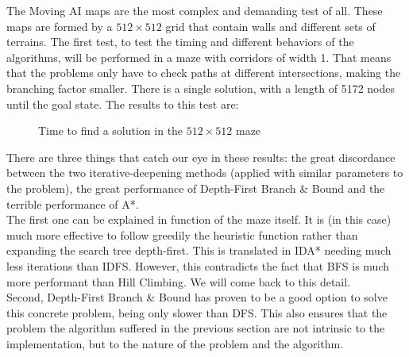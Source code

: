 The Moving AI maps are the most complex and demanding test of all. These maps
are formed by a $512 \times 512$ grid that contain walls and different sets of
terrains. The first test, to test the timing and different behaviors of the
algorithms, will be performed in a maze with corridors of width 1. That means
that the problems only have to check paths at different intersections, making
the branching factor smaller. There is a single solution, with a length of 5172
nodes until the goal state. The results to this test are:\\

\begin{figure}[!htbp]
  \centering
  \caption{Time to find a solution in the $512 \times 512$ maze}
  \label{mp:time}
\end{figure}

There are three things that catch our eye in these results: the great
discordance between the two iterative-deepening methods (applied with similar
parameters to the problem), the great performance of Depth-First Branch \&
Bound and the terrible performance of A*.\\

The first one can be explained in function of the maze itself. It is (in this
case) much more effective to follow greedily the heuristic function rather than
expanding the search tree depth-first. This is translated in IDA* needing much
less iterations than IDFS. However, this contradicts the fact that BFS is much
more performant than Hill Climbing. We will come back to this detail.\\

Second, Depth-First Branch \& Bound has proven to be a good option to solve
this concrete problem, being only slower than DFS. This also ensures that the
problem the algorithm suffered in the previous section are not intrinsic to the
implementation, but to the nature of the problem and the algorithm.\\

